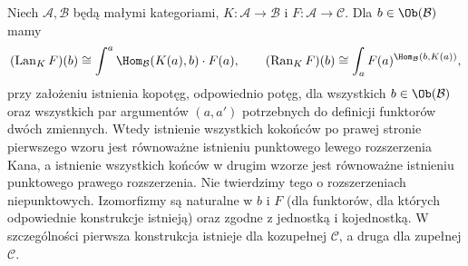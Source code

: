 \begin{twierdzenie}\label{cat:thm:kan-weighted}
Niech $\mathcal A,\mathcal B$ będą małymi kategoriami, $K:\mathcal A\to\mathcal B$ i $F:\mathcal A\to\mathcal C$. Dla $b\in\Ob(\mathcal B)$ mamy
\[
 (\operatorname{Lan}_K F)(b)
 \cong\int^a\Hom_{\mathcal B}(K(a),b)\cdot F(a),
 \qquad
 (\operatorname{Ran}_K F)(b)
 \cong\int_a F(a)^{\Hom_{\mathcal B}(b,K(a))},
\]
przy założeniu istnienia kopotęg, odpowiednio potęg, dla wszystkich $b\in\Ob(\mathcal B)$ oraz wszystkich par argumentów $(a,a')$ potrzebnych do definicji funktorów dwóch zmiennych. Wtedy istnienie wszystkich kokońców po prawej stronie pierwszego wzoru jest równoważne istnieniu punktowego lewego rozszerzenia Kana, a istnienie wszystkich końców w drugim wzorze jest równoważne istnieniu punktowego prawego rozszerzenia. Nie twierdzimy tego o rozszerzeniach niepunktowych. Izomorfizmy są naturalne w $b$ i $F$ (dla funktorów, dla których odpowiednie konstrukcje istnieją) oraz zgodne z jednostką i kojednostką. W szczególności pierwsza konstrukcja istnieje dla kozupełnej $\mathcal C$, a druga dla zupełnej $\mathcal C$.
\end{twierdzenie}
